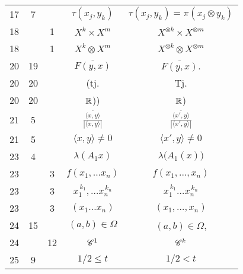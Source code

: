 \documentclass[a4paper,11pt]{article}
\begin{document}
\begin{center}
\begin{tabular}{|c|c|c|c|c|}
    17  &  7 & & $\tau( x_{ j }, y_{ k } )$
           & $\tau( x_{ j }, y_{ k } ) = \pi( x_{ j } \otimes y_{ k } )$ \\
    18  & &  1 & $X^{ k } \times X^{ m }$ & $X^{ \otimes k } \times X^{ \otimes m }$ \\
    18  & &  1 & $X^{ k } \otimes X^{ m }$ & $X^{ \otimes k } \otimes X^{ \otimes m }$ \\
    20  & 19 & & $\overline{ F( y, x ) }$ & $\overline{ F( y, x ) }$. \\
    20  & 20 & & (tj. & Tj. \\
    20  & 20 & & $\mathbb{R}$)) & $\mathbb{R}$) \\[0.3em]
    21  &  5 & & $\displaystyle
                 \frac{ \overline{ \langle x, y \rangle } }{ | \langle x, y \rangle | }$
           & $\displaystyle
             \frac{ \overline{ \langle x', y \rangle } }{ | \langle x', y \rangle | }$ \\
    21  &  5 & & $\langle x, y \rangle \neq 0$ & $\langle x', y \rangle \neq 0$ \\
    23  &  4 & & $\lambda ( A_{ 1 } x )$ & $\lambda \big( A_{ 1 }( x ) \big)$ \\
    23  & &  3 & $f( x_{ 1 }, \ldots x_{ n } )$ & $f( x_{ 1 }, \ldots, x_{ n } )$ \\
    23  & &  3 & $x_{ 1 }^{ \, k_{ 1 } }, \ldots x_{ n }^{ \, k_{ n } }$
           & $x_{ 1 }^{ \, k_{ 1 } } \ldots x_{ n }^{ \, k_{ n } }$ \\
    23  & &  3 & $( x_{ 1 } \ldots x_{ n } )$ & $( x_{ 1 }, \ldots, x_{ n } )$ \\
    24  & 15 & & $( a, b ) \in \Omega$ & $( a, b ) \in \Omega$, \\
    24  & & 12 & $\mathcal{C}^{ 1 }$ & $\mathcal{C}^{ k }$ \\
    25  &  9 & & $1 / 2 \leq t$ & $1 / 2 < t$ \\
    \hline
  \end{tabular}





  \newpage


\end{center}
\end{document}
